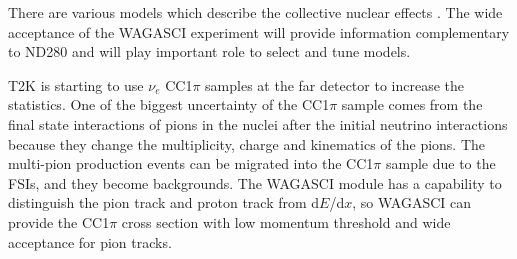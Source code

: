 There are various models which describe the collective nuclear effects \cite{collective_nuclear_effect}.
The wide acceptance of the WAGASCI experiment will provide information complementary to ND280 and will play important role to select and tune models.

T2K is starting to use $\nu_{e}$ CC1$\pi$ samples at the far detector to increase the statistics.
One of the biggest uncertainty of the CC1$\pi$ sample comes from the final state interactions of pions in the nuclei after the initial neutrino interactions because they change the multiplicity, charge and kinematics of the pions.
The multi-pion production events can be migrated into the CC1$\pi$ sample due to the FSIs, and they become backgrounds.
The WAGASCI module has a capability to distinguish the pion track and proton track from d$E$/d$x$, so 
WAGASCI can provide the CC1$\pi$ cross section with low momentum threshold and wide acceptance for pion tracks.




